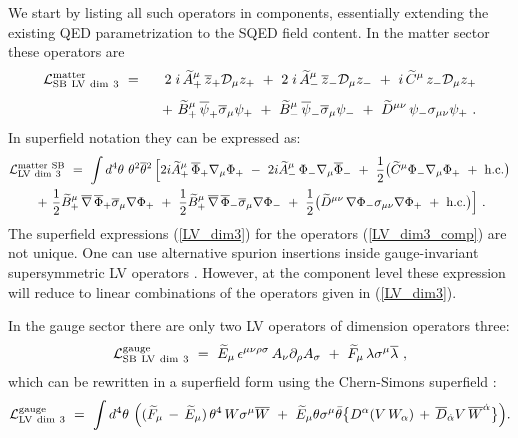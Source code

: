 \documentclass[12pt]{revtex4}
\begin{document}
We start by listing all such operators in components, essentially
extending the existing QED parametrization \cite{Kost1}  to the SQED
field content. In the matter sector these 
operators are  
%
\begin{eqnarray}
{\cal L}_{\rm SB~LV~dim~3}^{\rm matter} 
&~=~& 
2\;i\, \widetilde{A}_+^\mu\, \overline{z}_+ \mathcal{D}_\mu z_+ 
~+~ 2\;i\, \widetilde{A}_-^\mu\, \overline{z}_-\mathcal{D}_\mu z_- 
~+~i\, \widetilde{C}^\mu\, z_- \mathcal{D}_\mu z_+ 
\label{LV_dim3_comp}
\\[1ex] 
\nonumber
&& 
~+~\widetilde{B}_+^\mu\, \overline{\psi}_+\overline{\sigma}_\mu \psi_+ 
~+~ \widetilde{B}_-^\mu\, \overline{\psi}_-\overline{\sigma}_\mu \psi_-
 ~+~\widetilde{D}^{\mu\nu}\, \psi_- \sigma_{\mu\nu} \psi_+~.
\end{eqnarray}
%
In superfield notation they can be expressed as:
\begin{gather}
{\cal L}_{\rm LV~dim~3}^{\rm matter~SB} ~=~  
\int d^4\theta~ \theta^2\overline{\theta}{}^2 \, \Big[
2i  \widetilde{A}_+^\mu\,\overline{\Phi}_+ \nabla_\mu \Phi_+
~-~ 2i \widetilde{A}_-^\mu\, \Phi_-  \nabla_\mu \overline{\Phi}_-  
~+~ \frac 12\big(\widetilde{C}^\mu  \Phi_- \nabla_\mu \Phi_+ 
~+~ \text{h.c.}\big) 
\nonumber\\
\label{LV_dim3}
~+~ \frac{1}{2} \widetilde{B}_+^\mu\, 
\overline{\nabla}\, \overline{\Phi}_+ \overline{\sigma}_\mu \nabla \Phi_+
~+~ \frac{1}{2}\widetilde{B}_+^\mu\, 
\overline{\nabla}\, \overline{\Phi}_- \overline{\sigma}_\mu \nabla \Phi_- 
~+~ \frac 12\big(
\widetilde{D}^{\mu\nu}\, \nabla \Phi_- \sigma_{\mu\nu} \nabla \Phi_+
~+~ \text{h.c.}\big)
\Big]~. 
\end{gather}
%
The superfield expressions (\ref{LV_dim3}) for the operators
(\ref{LV_dim3_comp}) are not unique.  One can use alternative spurion
insertions  inside gauge-invariant supersymmetric LV operators
\cite{GrootNibbelink:2004za}. However, at the component level these
expression will reduce to linear combinations of the operators given
in (\ref{LV_dim3}).


In the gauge sector there are only two LV operators of dimension 
operators three: 
\begin{eqnarray}
{\cal L}_{\rm SB~LV~dim~3}^{\rm gauge} ~=~ 
\widetilde{E}_\mu\, \epsilon^{\mu\nu\rho\sigma}\, 
A_\nu \partial_\rho A_\sigma  ~+~ 
\widetilde{F}_\mu\, \lambda \sigma^\mu \overline{\lambda} 
~,
\end{eqnarray}
%
which can be rewritten in a superfield form using the 
Chern-Simons superfield \cite{Cecotti:1987nw}:
\begin{eqnarray}
\label{CSint}
{\cal L}_{\rm LV ~dim~3}^{\rm gauge} ~=~ \int d^4\theta~ 
\Big(
(\widetilde{F}_\mu \,-\,   \widetilde{E}_\mu)\, \theta^4\, 
 W \sigma^\mu \overline{W} 
~+~ \widetilde{E}_\mu\theta \sigma^\mu\bar\theta 
\big\{ 
D^\alpha (V\, W_\alpha) 
\,+\,  
\overline{D}_{\dot\alpha}V\, \overline{W}^{\dot\alpha}
\big\}
\Big).
\end{eqnarray}
%
\end{document}

